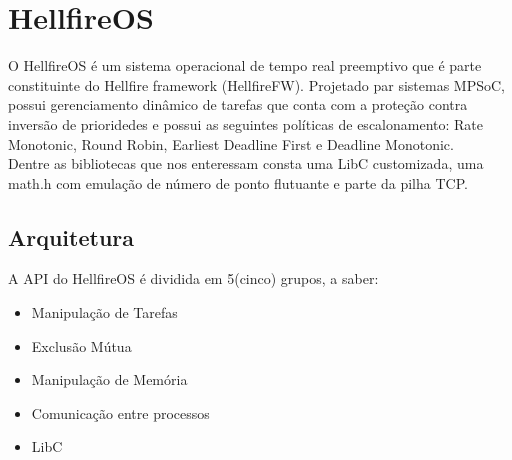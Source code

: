 \section{HellfireOS}
\label{sec:HellfireOS}
O HellfireOS é um sistema operacional de tempo real preemptivo que é parte constituinte
do Hellfire framework (HellfireFW). Projetado par sistemas MPSoC, possui gerenciamento
dinâmico de tarefas que conta com a proteção contra inversão de prioridedes e possui as
seguintes políticas de escalonamento:
Rate Monotonic, Round Robin, Earliest Deadline First e Deadline Monotonic.\\
Dentre as bibliotecas que nos enteressam consta uma LibC customizada, uma math.h com emulação
de número de ponto flutuante e parte da pilha TCP.
\subsection{Arquitetura}
A API do HellfireOS é dividida em 5(cinco) grupos, a saber:
\begin{itemize}
	\item Manipulação de Tarefas
	\item Exclusão Mútua
	\item Manipulação de Memória
	\item Comunicação entre processos
	\item LibC
\end{itemize}
